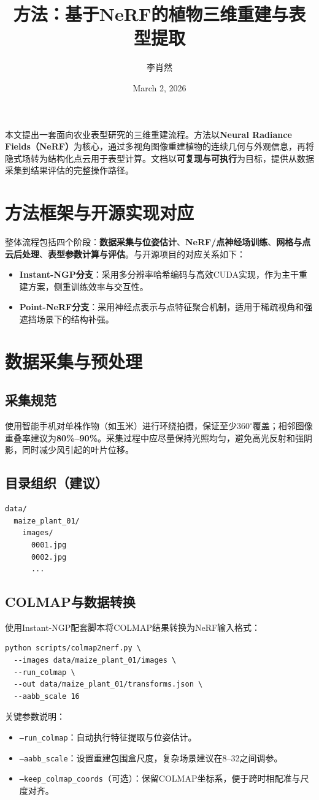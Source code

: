 \documentclass[12pt,a4paper,fontset=fandol]{ctexart}
\title{方法：基于NeRF的植物三维重建与表型提取}
\author{李肖然}
\date{March 2, 2026}
\begin{document}
\maketitle
\onehalfspacing

本文提出一套面向农业表型研究的三维重建流程。方法以\textbf{Neural Radiance Fields（NeRF）}为核心，通过多视角图像重建植物的连续几何与外观信息，再将隐式场转为结构化点云用于表型计算。文档以\textbf{可复现与可执行}为目标，提供从数据采集到结果评估的完整操作路径。

\section{方法框架与开源实现对应}
整体流程包括四个阶段：\textbf{数据采集与位姿估计}、\textbf{NeRF/点神经场训练}、\textbf{网格与点云后处理}、\textbf{表型参数计算与评估}。与开源项目的对应关系如下：
\begin{itemize}
  \item \textbf{Instant-NGP分支}：采用多分辨率哈希编码与高效CUDA实现，作为主干重建方案，侧重训练效率与交互性。
  \item \textbf{Point-NeRF分支}：采用神经点表示与点特征聚合机制，适用于稀疏视角和强遮挡场景下的结构补强。
\end{itemize}

\section{数据采集与预处理}
\subsection{采集规范}
使用智能手机对单株作物（如玉米）进行环绕拍摄，保证至少\textbf{$360^\circ$}覆盖；相邻图像重叠率建议为\textbf{80\%--90\%}。采集过程中应尽量保持光照均匀，避免高光反射和强阴影，同时减少风引起的叶片位移。

\subsection{目录组织（建议）}
\begin{verbatim}
data/
  maize_plant_01/
    images/
      0001.jpg
      0002.jpg
      ...
\end{verbatim}

\subsection{COLMAP与数据转换}
使用Instant-NGP配套脚本将COLMAP结果转换为NeRF输入格式：
\begin{verbatim}
python scripts/colmap2nerf.py \
  --images data/maize_plant_01/images \
  --run_colmap \
  --out data/maize_plant_01/transforms.json \
  --aabb_scale 16
\end{verbatim}
关键参数说明：
\begin{itemize}
  \item \texttt{--run\_colmap}：自动执行特征提取与位姿估计。
  \item \texttt{--aabb\_scale}：设置重建包围盒尺度，复杂场景建议在8--32之间调参。
  \item \texttt{--keep\_colmap\_coords}（可选）：保留COLMAP坐标系，便于跨时相配准与尺度对齐。
\end{itemize}
\end{document}
